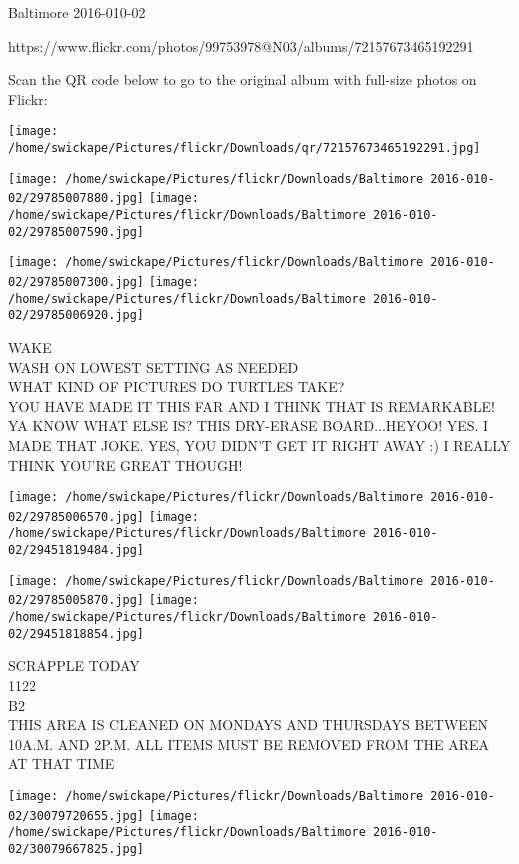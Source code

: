 \documentclass[10pt,letterpaper]{article}
\begin{document}
Baltimore 2016-010-02

https://www.flickr.com/photos/99753978@N03/albums/72157673465192291

Scan the QR code below to go to the original album with full-size photos on Flickr:

\texttt{[image: /home/swickape/Pictures/flickr/Downloads/qr/72157673465192291.jpg]}
\pagebreak

\texttt{[image: /home/swickape/Pictures/flickr/Downloads/Baltimore 2016-010-02/29785007880.jpg]}
\texttt{[image: /home/swickape/Pictures/flickr/Downloads/Baltimore 2016-010-02/29785007590.jpg]}

\texttt{[image: /home/swickape/Pictures/flickr/Downloads/Baltimore 2016-010-02/29785007300.jpg]}
\texttt{[image: /home/swickape/Pictures/flickr/Downloads/Baltimore 2016-010-02/29785006920.jpg]}

WAKE\\
WASH ON LOWEST SETTING AS NEEDED\\
WHAT KIND OF PICTURES DO TURTLES TAKE?\\
YOU HAVE MADE IT THIS FAR AND I THINK THAT IS REMARKABLE!  YA KNOW WHAT ELSE IS?  THIS DRY{-}ERASE BOARD...HEYOO! YES.  I MADE THAT JOKE.  YES, YOU DIDN'T GET IT RIGHT AWAY :) I REALLY THINK YOU'RE GREAT THOUGH!\\
\pagebreak

\texttt{[image: /home/swickape/Pictures/flickr/Downloads/Baltimore 2016-010-02/29785006570.jpg]}
\texttt{[image: /home/swickape/Pictures/flickr/Downloads/Baltimore 2016-010-02/29451819484.jpg]}

\texttt{[image: /home/swickape/Pictures/flickr/Downloads/Baltimore 2016-010-02/29785005870.jpg]}
\texttt{[image: /home/swickape/Pictures/flickr/Downloads/Baltimore 2016-010-02/29451818854.jpg]}

SCRAPPLE TODAY\\
1122\\
B2\\
THIS AREA IS CLEANED ON MONDAYS AND THURSDAYS BETWEEN 10A.M. AND 2P.M. ALL ITEMS MUST BE REMOVED FROM THE AREA AT THAT TIME\\
\pagebreak

\texttt{[image: /home/swickape/Pictures/flickr/Downloads/Baltimore 2016-010-02/30079720655.jpg]}
\texttt{[image: /home/swickape/Pictures/flickr/Downloads/Baltimore 2016-010-02/30079667825.jpg]}
\end{document}
